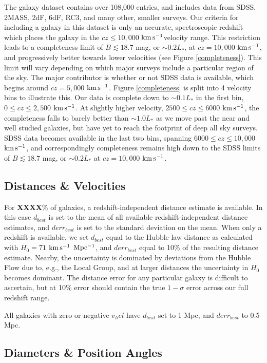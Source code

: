 \documentclass[iop]{emulateapj-rtx4}
\newcommand{\kms}{$\rm km\, s^{-1}$}
\begin{document}
The galaxy dataset contains over 108,000 entries, and includes data from SDSS, 2MASS, 2dF, 6dF, RC3, and many other, smaller surveys. Our criteria for including a galaxy in this dataset is only an accurate, spectroscopic redshift which places the galaxy in the $cz \leq 10,000$ \kms velocity range. This restriction leads to a completeness limit of $B \lesssim 18.7$ mag, or $\sim0.2 L_*$, at $cz = 10,000$ \kms, and progressively better towards lower velocities (see Figure \ref{completeness}). This limit will vary depending on which major surveys include a particular region of the sky. The major contributor is whether or not SDSS data is available, which begins around $cz = 5,000$ \kms. Figure \ref{completeness} is split into 4 velocity bins to illustrate this. Our data is complete down to $\sim0.1 L_*$ in the first bin, $0 \leq cz \leq 2,500$ \kms. At slightly higher velocity, $2500 \leq cz \leq 6000$ \kms, the completeness falls to barely better than $\sim1.0 L_*$ as we move past the near and well studied galaxies, but have yet to reach the footprint of deep all sky surveys. SDSS data becomes available in the last two bins, spanning $6000 \leq cz \leq 10,000$ \kms, and correspondingly completeness remains high down to the SDSS limits of $B \lesssim 18.7$ mag, or $\sim0.2 L_*$ at $cz = 10,000$ \kms.


\subsection{Distances \& Velocities}
For \textbf{XXXX}\% of galaxies, a redshift-independent distance estimate is available. In this case $d_{best}$ is set to the mean of all available redshift-independent distance estimates, and $derr_{best}$ is set to the standard deviation on the mean. When only a redshift is available, we set $d_{best}$ equal to the Hubble law distance as calculated with $H_0 = 71$ \kms $~\rm Mpc^{-1}$, and $derr_{best}$ equal to 10\% of the resulting distance estimate. Nearby, the uncertainty is dominated by deviations from the Hubble Flow due to, e.g., the Local Group, and at larger distances the uncertainty in $H_0$ becomes dominant. The distance error for any particular galaxy is difficult to ascertain, but at 10\% error should contain the true $1-\sigma$ error across our full redshift range.

All galaxies with zero or negative $v_hel$ have $d_{best}$ set to 1 Mpc, and $derr_{best}$ to 0.5 Mpc. 


\subsection{Diameters \& Position Angles}
\end{document}

